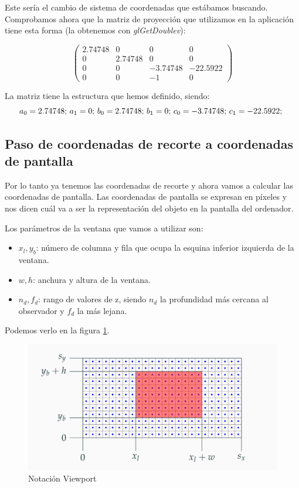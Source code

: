 \documentclass[a4paper,11pt, oneside]{book}
\begin{document}
Este sería el cambio de sistema de coordenadas que estábamos buscando. Comprobamos ahora que la matriz de proyección que utilizamos en la aplicación tiene esta forma (la obtenemos con \textit{glGetDoublev}):

$$\begin{pmatrix}
2.74748 & 0&0&0\\
0&2.74748 &0&0\\
0&0&-3.74748&-22.5922\\
0&0&-1&0
\end{pmatrix}$$

La matriz tiene la estructura que hemos definido, siendo:
$$a_0 = 2.74748\textup{;  }
a_1 = 0\textup{;  }
b_0 = 2.74748\textup{;  }
b_1 = 0\textup{;  }
c_0 = -3.74748\textup{;  }
c_1 = -22.5922\textup{;  }
$$

\subsection{Paso de coordenadas de recorte a coordenadas de pantalla}
Por lo tanto ya tenemos las coordenadas de recorte y ahora vamos a calcular las coordenadas de pantalla. Las coordenadas de pantalla se expresan en píxeles y nos dicen cuál va a ser la representación del objeto en la pantalla del ordenador.

Los parámetros de la ventana que vamos a utilizar son:
\begin{itemize}
	\item $x_l, y_b$: número de columna y fila que ocupa la esquina inferior izquierda de la ventana.
	\item $w,h$: anchura y altura de la ventana.
	\item $n_d, f_d$: rango de valores de z, siendo $n_d$ la profundidad más cercana al observador y $f_d$ la más lejana.
\end{itemize}
Podemos verlo en la figura \ref{fig:viewport}.
\begin{figure}[H]
	
	\centering
	\includegraphics[width=\linewidth]{viewport}
	\caption{Notación Viewport \cite{informatica-grafica}}
	\label{fig:viewport}
	
\end{figure}
\end{document}

